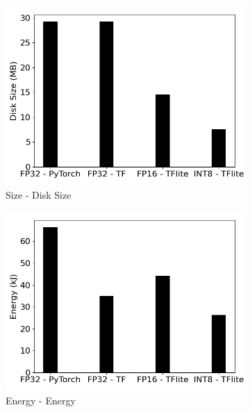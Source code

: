 \begin{figure}[]
\begin{subfigure}{0.19\textwidth}
        \includegraphics[width=1\textwidth]{other/figures/YOLOv5s_COCO_RasPi/rasPI_size_v2.png}
        \caption{Size - Disk Size}
    \end{subfigure}
    \begin{subfigure}{0.19\textwidth}
        \includegraphics[width=1\textwidth]{other/figures/YOLOv5s_COCO_RasPi/rasPI_energy_v2.png}
        \caption{Energy - Energy}
    \end{subfigure}
    \begin{subfigure}{0.19\textwidth}

\end{subfigure}
\end{figure}
